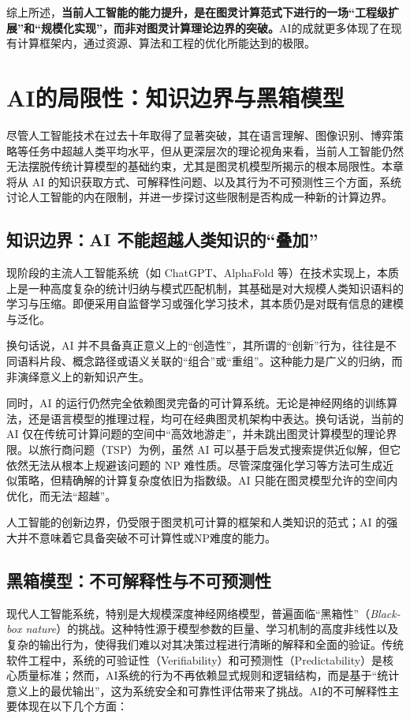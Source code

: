 \documentclass[UTF8,openany,zihao=5]{ctexbook}
\begin{document}
综上所述，\textbf{当前人工智能的能力提升，是在图灵计算范式下进行的一场“工程级扩展”和“规模化实现”，而非对图灵计算理论边界的突破。}AI的成就更多体现了在现有计算框架内，通过资源、算法和工程的优化所能达到的极限。

\chapter{AI的局限性：知识边界与黑箱模型}
\label{sec:AI_explainability}

尽管人工智能技术在过去十年取得了显著突破，其在语言理解、图像识别、博弈策略等任务中超越人类平均水平，但从更深层次的理论视角来看，当前人工智能仍然无法摆脱传统计算模型的基础约束，尤其是图灵机模型所揭示的根本局限性。本章将从 AI 的知识获取方式、可解释性问题、以及其行为不可预测性三个方面，系统讨论人工智能的内在限制，并进一步探讨这些限制是否构成一种新的计算边界。

\section{知识边界：AI 不能超越人类知识的“叠加”}

现阶段的主流人工智能系统（如 ChatGPT、AlphaFold 等）在技术实现上，本质上是一种高度复杂的统计归纳与模式匹配机制，其基础是对大规模人类知识语料的学习与压缩。即便采用自监督学习或强化学习技术，其本质仍是对既有信息的建模与泛化。

换句话说，AI 并不具备真正意义上的“创造性”，其所谓的“创新”行为，往往是不同语料片段、概念路径或语义关联的“组合”或“重组”。这种能力是广义的归纳，而非演绎意义上的新知识产生。

同时，AI 的运行仍然完全依赖图灵完备的可计算系统。无论是神经网络的训练算法，还是语言模型的推理过程，均可在经典图灵机架构中表达。换句话说，当前的 AI 仅在传统可计算问题的空间中“高效地游走”，并未跳出图灵计算模型的理论界限。以旅行商问题（TSP）为例，虽然 AI 可以基于启发式搜索提供近似解，但它依然无法从根本上规避该问题的 NP 难性质。尽管深度强化学习等方法可生成近似策略，但精确解的计算复杂度依旧为指数级。AI 只能在图灵模型允许的空间内优化，而无法“超越”。

人工智能的创新边界，仍受限于图灵机可计算的框架和人类知识的范式；AI 的强大并不意味着它具备突破不可计算性或NP难度的能力。

\section{黑箱模型：不可解释性与不可预测性}

现代人工智能系统，特别是大规模深度神经网络模型，普遍面临“黑箱性”（\textit{Black-box nature}）的挑战。这种特性源于模型参数的巨量、学习机制的高度非线性以及复杂的输出行为，使得我们难以对其决策过程进行清晰的解释和全面的验证。传统软件工程中，系统的可验证性（Verifiability）和可预测性（Predictability）是核心质量标准；然而，AI系统的行为不再依赖显式规则和逻辑结构，而是基于“统计意义上的最优输出”，这为系统安全和可靠性评估带来了挑战。AI的不可解释性主要体现在以下几个方面：
\end{document}

